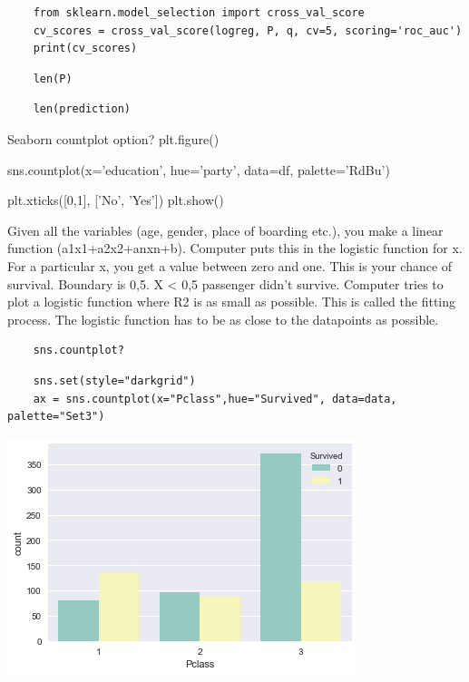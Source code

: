 \documentclass[11pt]{article}
\begin{document}
\begin{verbatim}
    from sklearn.model_selection import cross_val_score
    cv_scores = cross_val_score(logreg, P, q, cv=5, scoring='roc_auc')
    print(cv_scores)
\end{verbatim}

\begin{verbatim}
    len(P)
\end{verbatim}

\begin{verbatim}
    len(prediction)
\end{verbatim}

Seaborn countplot option? plt.figure()

sns.countplot(x='education', hue='party', data=df, palette='RdBu')

plt.xticks([0,1], ['No', 'Yes']) plt.show()

Given all the variables (age, gender, place of boarding etc.), you make
a linear function (a1x1+a2x2+anxn+b). Computer puts this in the logistic
function for x. For a particular x, you get a value between zero and
one. This is your chance of survival. Boundary is 0,5. X < 0,5 passenger
didn't survive. Computer tries to plot a logistic function where R2 is
as small as possible. This is called the fitting process. The logistic
function has to be as close to the datapoints as possible.

\begin{verbatim}
    sns.countplot?
\end{verbatim}

\begin{verbatim}
    sns.set(style="darkgrid")
    ax = sns.countplot(x="Pclass",hue="Survived", data=data, palette="Set3")
\end{verbatim}

\begin{center}
\includegraphics[width=.9\linewidth]{output_64_0.png}
\end{center}
\end{document}

